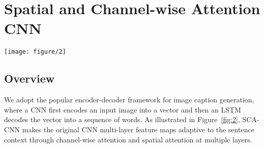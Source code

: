 \documentclass[10pt,twocolumn,letterpaper]{article}
\begin{document}
\section{Spatial and Channel-wise Attention CNN}\begin{figure*}[t]
	\centering
	\texttt{[image: figure/2]}
    \caption{The overview of our proposed SCA-CNN. For the $l$-th layer, initial feature map $\mathbf{V}^l$ is the output of $(l-1)$-th conv-layer.
    We first use the channel-wise attention function $\Phi_c$ to obtain the channel-wise attention weights $\beta^l$, which are multiplied in channel-wise of the
    feature map. Then, we use the spatial attention function $\Phi_s$ to obtain the spatial attention weights $\alpha^l$, which are multiplied in each spatial
    regions, resulting in an attentive feature map $\mathbf{X}^l$. Different orders of two attention mechanism are discussed in Section~\ref{sec:channel}.}
\label{fig:2}
\end{figure*}\subsection{Overview}
We adopt the popular encoder-decoder framework for image caption generation, where a CNN first encodes an input image into a vector and then an LSTM decodes
the vector into a sequence of words. As illustrated in Figure~\ref{fig:2}, SCA-CNN makes the original CNN multi-layer feature maps adaptive to the sentence
context through channel-wise attention and spatial attention at multiple layers.
\end{document}
